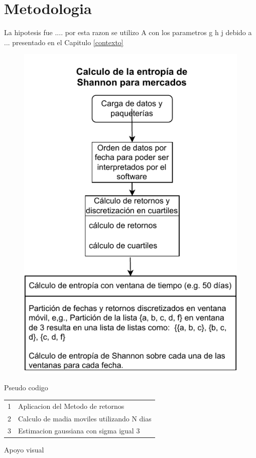 %
\chapter{Metodologia}
\label{Metodologia}

La hipotesis fue ....
por esta razon se utilizo 
A  con los parametros g h j debido a ... presentado en el Capitulo \ref{contexto}

\begin{figure}
	\centering
	\includegraphics[width=0.7\linewidth]{figures/diagrama_entropia1}
	\caption{}
	\label{diagramaentropia1}
\end{figure}



Pseudo codigo 
\begin{center}
	\begin{tabular}{ |r l| }
		 \hline
		1 & Aplicacion del Metodo de retornos\\
		2 & Calculo de madia moviles utilizando N dias\\ 
		3 & Estimacion gaussiana con sigma igual 3 \\
		 \hline
	\end{tabular}
\end{center}



Apoyo visual 